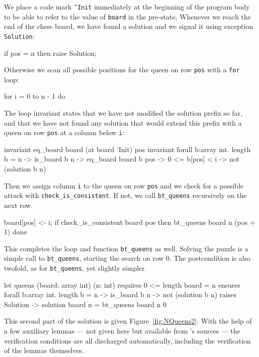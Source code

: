 We place a code mark \texttt{'Init} immediately at the beginning of
the program body to
be able to refer to the value of \texttt{board} in the pre-state.
Whenever we reach the end of the chess board, we have found a solution
and we signal it using exception \texttt{Solution}:
\begin{whycode}
    if pos = n then raise Solution;
\end{whycode}
Otherwise we scan all possible positions for the queen on row
\texttt{pos} with a \texttt{for} loop:
\begin{whycode}
    for i = 0 to n - 1 do
\end{whycode}
The loop invariant states that we have not modified the solution
prefix so far, and that we have not found any solution that would
extend this prefix with a queen on row \texttt{pos} at a column below
\texttt{i}:
\begin{whycode}
      invariant { eq_board board (at board 'Init) pos }
      invariant { forall b:array int.  length b = n -> is_board b n ->
        eq_board board b pos -> 0 <= b[pos] < i -> not (solution b n) }
\end{whycode}
Then we assign column \texttt{i} to the queen on row \texttt{pos} and
we check for a possible attack with \verb|check_is_consistent|. If
not, we call \verb|bt_queens| recursively on the next row.
\begin{whycode}
      board[pos] <- i;
      if check_is_consistent board pos then bt_queens board n (pos + 1)
    done
\end{whycode}
This completes the loop and function \verb|bt_queens| as well.
Solving the puzzle is a simple call to \verb|bt_queens|, starting the
search on row 0. The postcondition is also twofold, as for
\verb|bt_queens|, yet slightly simpler.
\begin{whycode}
  let queens (board: array int) (n: int)
    requires { 0 <= length board = n }
    ensures  { forall b:array int.
                 length b = n -> is_board b n -> not (solution b n) }
    raises   { Solution -> solution board n }
  = bt_queens board n 0
\end{whycode}
This second part of the solution is given Figure~\ref{fig:NQueens2}.
With the help of a few auxiliary lemmas --- not given here but available
from \why's sources --- the verification conditions are all discharged
automatically, including the verification of the lemmas themselves.
